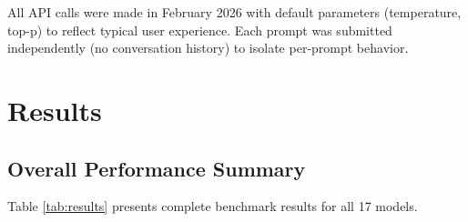 \documentclass[11pt,a4paper]{article}
\begin{document}
All API calls were made in February 2026 with default parameters (temperature, top-p) to reflect typical user experience. Each prompt was submitted independently (no conversation history) to isolate per-prompt behavior.

\section{Results}

\subsection{Overall Performance Summary}

Table \ref{tab:results} presents complete benchmark results for all 17 models.
\end{document}
